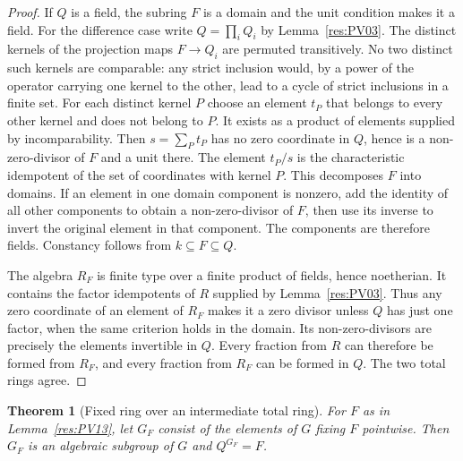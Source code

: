 \documentclass[11pt,oneside,openany]{book}
\newtheorem{theorem}{Theorem}[chapter]
\theoremstyle{definition}
\theoremstyle{remark}
\begin{document}
\begin{proof}
If \(Q\) is a field, the subring \(F\) is a domain and the
unit condition makes it a field. For the difference case write
\(Q=\prod_i Q_i\) by Lemma~\ref{res:PV03}. The distinct kernels
of the projection maps \(F\to Q_i\) are permuted transitively.
No two distinct such kernels are comparable: any strict inclusion
would, by a power of the operator carrying one kernel to the other,
lead to a cycle of strict inclusions in a finite set.
For each distinct kernel \(P\) choose an element \(t_P\) that
belongs to every other kernel and does not belong to \(P\).
It exists as a product of elements supplied by incomparability.
Then \(s=\sum_P t_P\) has no zero coordinate in \(Q\), hence
is a non-zero-divisor of \(F\) and a unit there. The element
\(t_P/s\) is the characteristic idempotent of the set of
coordinates with kernel \(P\). This decomposes \(F\) into domains.
If an element in one domain component is nonzero, add the
identity of all other components to obtain a non-zero-divisor
of \(F\), then use its inverse to invert the original element
in that component. The components are therefore fields.
Constancy follows from \(k\subseteq F\subseteq Q\).

The algebra \(R_F\) is finite type over a finite product of
fields, hence noetherian. It contains the factor idempotents
of \(R\) supplied by Lemma~\ref{res:PV03}. Thus any zero
coordinate of an element of \(R_F\) makes it a zero divisor
unless \(Q\) has just one factor, when the same criterion
holds in the domain. Its non-zero-divisors are precisely the
elements invertible in \(Q\). Every fraction from \(R\) can
therefore be formed from \(R_F\), and every fraction from \(R_F\)
can be formed in \(Q\). The two total rings agree.
\end{proof}

\begin{theorem}[Fixed ring over an intermediate total ring]
\label{res:PV14}
For \(F\) as in Lemma~\ref{res:PV13}, let \(G_F\) consist of the
elements of \(G\) fixing \(F\) pointwise. Then \(G_F\) is an
algebraic subgroup of \(G\) and \(Q^{G_F}=F\).
\end{theorem}
\end{document}
